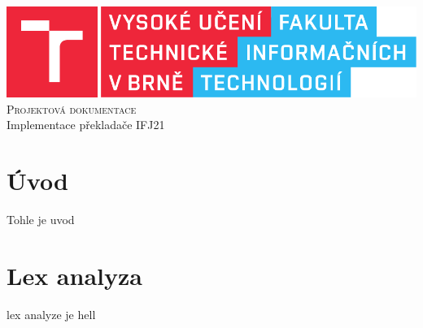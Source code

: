 \documentclass[11pt]{article}
\begin{document}
\begin{titlepage}
    \begin{center}
        \includegraphics[scale=0.8]{pics/fitlogo.pdf} \\
    
        \textsc{\Huge Projektová dokumentace}\\
        
        \LARGE
            Implementace překladače IFJ21
    \end{center}
    

\end{titlepage}

\newpage
\tableofcontents
\thispagestyle{empty}
\newpage
\setcounter{page}{1}


\section*{Úvod}
Tohle je uvod

\section{Lex analyza}
lex analyze je hell
\end{document}
